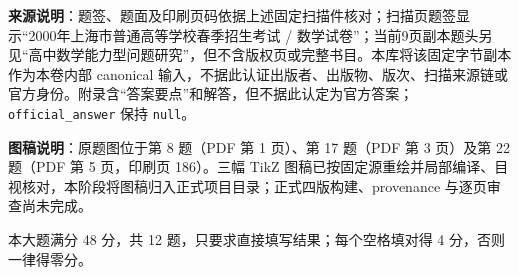 


\begin{gktip}
\textbf{来源说明}：题签、题面及印刷页码依据上述固定扫描件核对；扫描页题签显示“2000年上海市普通高等学校春季招生考试 / 数学试卷”；当前9页副本题头另见“高中数学能力型问题研究”，但不含版权页或完整书目。本库将该固定字节副本作为本卷内部 canonical 输入，不据此认证出版者、出版物、版次、扫描来源链或官方身份。附录含“答案要点”和解答，但不据此认定为官方答案；\texttt{official_answer} 保持 \texttt{null}。

\textbf{图稿说明}：原题图位于第 8 题（PDF 第 1 页）、第 17 题（PDF 第 3 页）及第 22 题（PDF 第 5 页，印刷页 186）。三幅 TikZ 图稿已按固定源重绘并局部编译、目视核对，本阶段将图稿归入正式项目目录；正式四版构建、provenance 与逐页审查尚未完成。
\end{gktip}


本大题满分 48 分，共 12 题，只要求直接填写结果；每个空格填对得 4 分，否则一律得零分。

